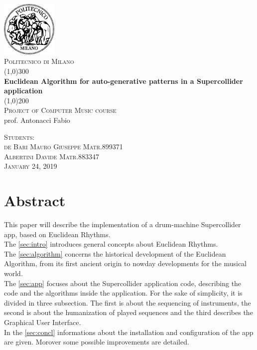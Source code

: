 \documentclass[a4paper, 12pt]{article}
\newcommand\blueref[1]{{\hypersetup{linkbordercolor=blue}\autoref{#1}}}
\begin{document}
\begin{titlepage}
	\begin{center}
	\includegraphics[width=0.2\textwidth]{images/logo.png}\\[0.3cm] 
	\textsc{\normalsize Politecnico di Milano}\\[4cm]
	\line(1,0){300}\\
	[0.25in]
	\huge{\bfseries Euclidean Algorithm for auto-generative patterns in a Supercollider application}\\
	[2mm]
	\line(1,0){200}\\
	[1cm]
	\textsc{\LARGE Project of Computer Music course}\\
	[0.1cm]
	{\large prof. Antonacci Fabio}\\
	[4cm]
	\end{center}
	\begin{flushright}
	\textsc{\large  Students:\\
	de Bari Mauro Giuseppe Matr.899371 \\
	Albertini Davide Matr.883347\\
	January 24, 2019 \\}
	\end{flushright}
\end{titlepage}

\section*{Abstract}
This paper will describe the implementation of a drum-machine Supercollider app, based on Euclidean Rhythms.\\
The \blueref{sec:intro} introduces general concepts about Euclidean Rhythms.\\
The \blueref{sec:algorithm} concerns the historical development of the Euclidean Algorithm, from its first ancient origin to nowday developments for the musical world.\\
The \blueref{sec:app} focuses about the Supercollider application code, describing the code and the algorithms inside the application. For the sake of simplicity, it is divided in three subsection. The first is about the sequencing of instruments, the second is about the humanization of played sequences and the third describes the Graphical User Interface.\\
In the \blueref{sec:concl} informations about the installation and configuration of the app are given. Morover some possible improvements are detailed.
\end{document}
